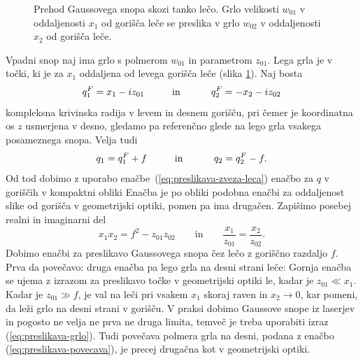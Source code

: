 \begin{figure}[h]
\centering
\def\svgwidth{120truemm} 

\caption{Prehod Gaussovega snopa skozi
tanko lečo. Grlo velikosti $w_{01}$ v oddaljenosti $x_{1}$ od gorišča
leče se preslika v grlo $w_{02}$ v oddaljenosti $x_{2}$ od gorišča
leče.}
\label{fig:Prehod-Gaussovega-snopa}
\end{figure}
Vpadni snop naj ima grlo s polmerom $w_{01}$ in parametrom $z_{01}$. Lega grla je 
v točki, ki je za $x_{1}$ oddaljena od levega gorišča leče (slika
\ref{fig:Prehod-Gaussovega-snopa}). Naj bosta 
\begin{equation}
q_{1}^{F}=x_{1}-iz_{01}\mbox{\hskip1cm in \hskip1cm}q_{2}^{F}=-x_{2}-iz_{02}
\end{equation}
 kompleksna krivinska radija v levem in desnem gorišču, pri čemer je koordinatna os $z$ 
 usmerjena v desno, gledamo pa referenčno glede na lego grla vsakega posameznega snopa. Velja tudi
\begin{equation}
q_{1}=q_{1}^{F}+f\mbox{\hskip1cm in \hskip1cm}q_{2}=q_{2}^{F}-f.
\end{equation}
 Od tod dobimo z uporabo enačbe~(\ref{eq:preslikava-zveza-leca}) enačbo
za $q$ v goriščih v kompaktni obliki 
 Enačba je po obliki podobna enačbi za oddaljenost slike od gorišča v
geometrijski optiki, pomen pa ima drugačen. Zapišimo posebej realni
in imaginarni del 
\begin{equation}
x_{1}x_{2}=f^{2}-z_{01}z_{02} \qquad \mathrm{in} \qquad
\frac{x_{1}}{z_{01}}=\frac{x_{2}}{z_{02}}.
\end{equation}
Dobimo enačbi za preslikavo Gaussovega snopa čez lečo z goriščno razdaljo $f$.
Prva da povečavo:
druga enačba pa lego grla na desni strani leče: 
Gornja enačba se ujema z izrazom za preslikavo točke v geometrijski
optiki le, kadar je $z_{01}\ll x_{1}$. Kadar je $z_{01}\gg f$, je
val na leči pri vsakem $x_{1}$ skoraj raven in $x_2 \to 0$, kar pomeni, da leži
grlo na desni strani v gorišču. V praksi dobimo Gaussove snope iz laserjev in pogosto ne
velja ne prva ne druga limita, temveč je treba uporabiti izraz (\ref{eq:preslikava-grlo}).
Tudi povečava polmera grla na desni, podana z enačbo (\ref{eq:preslikava-povecava}),
je precej drugačna kot v geometrijski optiki.\\


